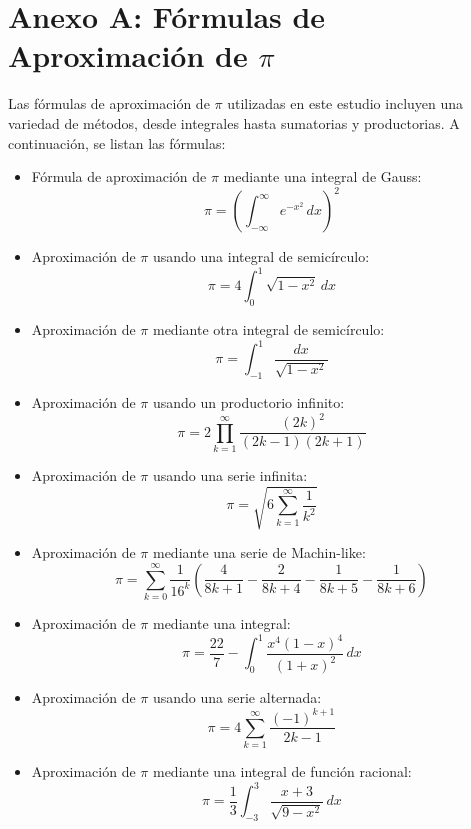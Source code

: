 \documentclass[conference, a4paper]{IEEEtran}
\begin{document}
\section*{Anexo A: Fórmulas de Aproximación de \(\pi\)}

Las fórmulas de aproximación de \(\pi\) utilizadas en este estudio incluyen una variedad de métodos, desde integrales hasta sumatorias y productorias. A continuación, se listan las fórmulas:

\begin{itemize}
    \item Fórmula de aproximación de \(\pi\) mediante una integral de Gauss:
    \[
    \pi = \left( \int_{-\infty}^{\infty} e^{-x^2} \, dx \right)^2
    \]

    \item Aproximación de \(\pi\) usando una integral de semicírculo:
    \[
    \pi = 4 \int_{0}^{1} \sqrt{1 - x^2} \, dx
    \]

    \item Aproximación de \(\pi\) mediante otra integral de semicírculo:
    \[
    \pi = \int_{-1}^{1} \frac{dx}{\sqrt{1 - x^2}}
    \]

    \item Aproximación de \(\pi\) usando un productorio infinito:
    \[
    \pi = 2 \prod_{k=1}^{\infty} \frac{(2k)^2}{(2k - 1)(2k + 1)}
    \]

    \item Aproximación de \(\pi\) usando una serie infinita:
    \[
    \pi = \sqrt{6 \sum_{k=1}^{\infty} \frac{1}{k^2}}
    \]

    \item Aproximación de \(\pi\) mediante una serie de Machin-like:
    \[
    \pi = \sum_{k=0}^{\infty} \frac{1}{16^k} \left( \frac{4}{8k + 1} - \frac{2}{8k + 4} - \frac{1}{8k + 5} - \frac{1}{8k + 6} \right)
    \]

    \item Aproximación de \(\pi\) mediante una integral:
    \[
    \pi = \frac{22}{7} - \int_{0}^{1} \frac{x^4 (1 - x)^4}{(1 + x)^2} \, dx
    \]

    \item Aproximación de \(\pi\) usando una serie alternada:
    \[
    \pi = 4 \sum_{k=1}^{\infty} \frac{(-1)^{k+1}}{2k - 1}
    \]

    \item Aproximación de \(\pi\) mediante una integral de función racional:
    \[
    \pi = \frac{1}{3} \int_{-3}^{3} \frac{x + 3}{\sqrt{9 - x^2}} \, dx
    \]
\end{itemize}
\end{document}
